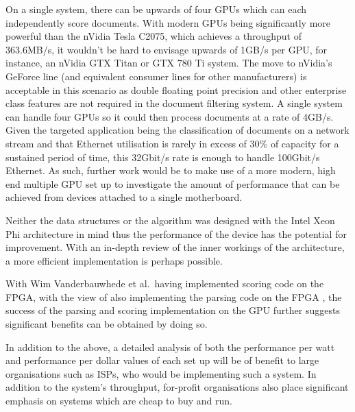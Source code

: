 On a single system, there can be upwards of four GPUs which can each
independently score documents. With modern GPUs being significantly more
powerful than the nVidia Tesla C2075, which achieves a throughput of 363.6MB/s,
it wouldn't be hard to envisage upwards of 1GB/s per GPU, for instance, an
nVidia GTX Titan or GTX 780 Ti system. The move to nVidia's GeForce line (and
equivalent consumer lines for other manufacturers) is acceptable in this
scenario as double floating point precision and other enterprise class features
are not required in the document filtering system. A single system can handle
four GPUs so it could then process documents at a rate of 4GB/s. Given the
targeted application being the classification of documents on a network stream
and that Ethernet utilisation is rarely in excess of 30\% of capacity for a
sustained period of time, this 32Gbit/s rate is enough to handle 100Gbit/s
Ethernet. As such, further work would be to make use of a more modern, high end
multiple GPU set up to investigate the amount of performance that can be
achieved from devices attached to a single motherboard.

Neither the data structures or the algorithm was designed with the Intel Xeon
Phi architecture in mind thus the performance of the device has the potential
for improvement. With an in-depth review of the inner workings of the
architecture, a more efficient implementation is perhaps possible.

With Wim Vanderbauwhede et al.\ having implemented scoring code on the FPGA,
with the view of also implementing the parsing code on the FPGA
\cite{HybridCPUFPGA}, the success of the parsing and scoring implementation on
the GPU further suggests significant benefits can be obtained by doing so.

In addition to the above, a detailed analysis of both the performance per watt
and performance per dollar values of each set up will be of benefit to large
organisations such as ISPs, who would be implementing such a system. In addition
to the system's throughput, for-profit organisations also place significant
emphasis on systems which are cheap to buy and run.
